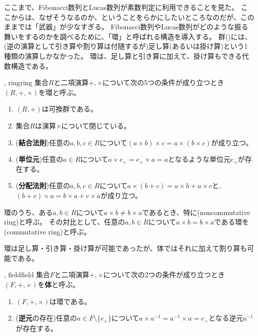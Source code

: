 ここまで、Fibonacci数列とLucas数列が素数判定に利用できることを見た。
ここからは、なぜそうなるのか、ということをらかにしたいところなのだが、このままでは「武器」が少なすぎる。
Fibonacci数列やLucas数列がどのような振る舞いをするのかを調べるために、「環」と呼ばれる構造を導入する。
群()には、(逆の演算として引き算や割り算は付随するが)足し算(あるいは掛け算)という1種類の演算しかなかった。
環は、足し算と引き算に加えて、掛け算もできる代数構造である。

\begin{Defi}{, ring}{ring}
集合$R$と二項演算$+,\times$について次の5つの条件が成り立つとき$(R,+,\times)$を環と呼ぶ。
\begin{enumerate}
 \item $(R,+)$は可換群である。
 \item 集合$R$は演算$\times$について閉じている。
 \item (\textbf{結合法則})任意の$a,b,c{\in}R$について$(a{\times}b){\times}c=a{\times}(b{\times}c)$が成り立つ。
 \item (\textbf{単位元})任意の$a{\in}R$について$a{\times}e_{\times}=e_{\times}{\times}a=a$となるような単位元$e_{\times}$が存在する。
 \item (\textbf{分配法則})任意の$a,b,c{\in}R$について$a{\times}(b{+}c)=a{\times}b{+}a{\times}c$と, $(b+c)\times{a}=b\times{a}+c\times{a}$が成り立つ。
\end{enumerate}
\end{Defi}

環のうち、ある$a,b{\in}R$について$a \times b \neq b \times a$であるとき、特に(noncommutative ring)と呼ぶ。
その対比として、任意の$a,b{\in}R$について$a \times b = b \times a$である環を(commutative ring)と呼ぶ。

環は足し算・引き算・掛け算が可能であったが、体ではそれに加えて割り算も可能である。

\begin{Defi}{, field}{field}
集合$F$と二項演算$+,\times$について次の2つの条件が成り立つとき$(F,+,\times)$を\textbf{体}と呼ぶ。
\begin{enumerate}
 \item $(F,+,\times)$は環である。
 \item (\textbf{逆元}の存在)任意の$a\in{F}\setminus\{e_{+}\}$について$a{\times}a^{-1}=a^{-1}{\times}a=e_{\times}$となる逆元$a^{-1}$が存在する。
\end{enumerate}
\end{Defi}

